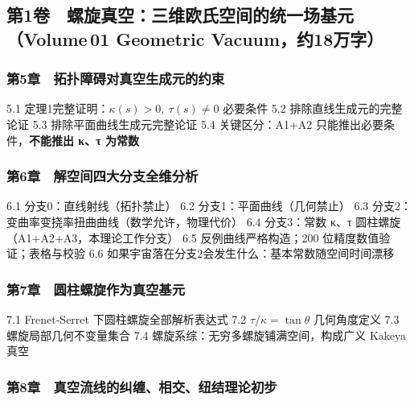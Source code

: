 \subsection{第1卷 螺旋真空：三维欧氏空间的统一场基元（Volume\,01
Geometric
Vacuum，约18万字）}\label{ux7b2c1ux5377-ux87baux65cbux771fux7a7aux4e09ux7ef4ux6b27ux6c0fux7a7aux95f4ux7684ux7edfux4e00ux573aux57faux5143volume-01-geometric-vacuumux7ea618ux4e07ux5b57}

\subsubsection{第5章 拓扑障碍对真空生成元的约束}\label{ux7b2c5ux7ae0-ux62d3ux6251ux969cux788dux5bf9ux771fux7a7aux751fux6210ux5143ux7684ux7ea6ux675f}

5.1 定理1完整证明：\(\kappa(s)>0,\ \tau(s)\neq0\) 必要条件 5.2
排除直线生成元的完整论证 5.3 排除平面曲线生成元完整论证 5.4
关键区分：A1+A2 只能推出必要条件，\textbf{不能推出 κ、τ 为常数}

\subsubsection{第6章 解空间四大分支全维分析}\label{ux7b2c6ux7ae0-ux89e3ux7a7aux95f4ux56dbux5927ux5206ux652fux5168ux7ef4ux5206ux6790}

6.1 分支0：直线射线（拓扑禁止） 6.2 分支1：平面曲线（几何禁止） 6.3
分支2：变曲率变挠率扭曲曲线（数学允许，物理代价） 6.4 分支3：常数 κ、τ
圆柱螺旋（A1+A2+A3，本理论工作分支） 6.5 反例曲线严格构造；200
位精度数值验证；表格与校验 6.6
如果宇宙落在分支2会发生什么：基本常数随空间时间漂移

\subsubsection{第7章 圆柱螺旋作为真空基元}\label{ux7b2c7ux7ae0-ux5706ux67f1ux87baux65cbux4f5cux4e3aux771fux7a7aux57faux5143}

7.1 Frenet‑Serret 下圆柱螺旋全部解析表达式 7.2
\(\tau/\kappa=\tan\theta\) 几何角度定义 7.3 螺旋局部几何不变量集合 7.4
螺旋系综：无穷多螺旋铺满空间，构成广义 Kakeya 真空

\subsubsection{第8章 真空流线的纠缠、相交、纽结理论初步}\label{ux7b2c8ux7ae0-ux771fux7a7aux6d41ux7ebfux7684ux7ea0ux7f20ux76f8ux4ea4ux7ebdux7ed3ux7406ux8bbaux521dux6b65}

